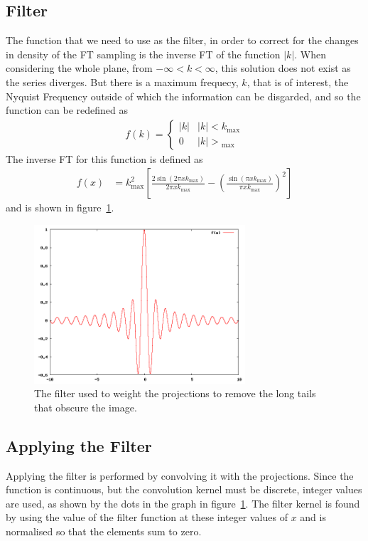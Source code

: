     \subsection{Filter} %
    \label{sub:filter}
        The function that we need to use as the filter, in order to correct for the changes in density of the FT sampling is the inverse FT of the function $|k|$. When considering the whole plane, from $-\infty < k < \infty$, this solution does not exist as the series diverges. But there is a maximum frequecy, $k$, that is of interest, the Nyquist Frequency outside of which the information can be disgarded, and so the function can be redefined as
        \begin{align}
            f(k) =
                \begin{cases}
                    |k| & |k| < k{_\text{max}} \\
                    0   & |k| > {_\text{max}}
                \end{cases}
        \end{align}
        The inverse FT for this function is defined as 
        \begin{align}
            f(x) &= k^2_{\text{max}} \left[ \frac{2\sin(2\pi xk_{\text{max}})}{2\pi xk_{\text{max}}} - \left( \frac{\sin(\pi xk_{\text{max}})}{\pi xk_{\text{max}}} \right)^2 \right]
        \end{align}
        and is shown in figure~\ref{fig:filter_graph}.
        \begin{figure}[ht]
            \centering
                \includegraphics[width=0.7\textwidth]{Files/report_images/inverse_FT_filter.png}
            \caption{The filter used to weight the projections to remove the long tails that obscure the image.\label{fig:filter_graph}}
        \end{figure}
    \subsection{Applying the Filter} %
    \label{sub:applying_the_filter}
        Applying the filter is performed by convolving it with the projections. Since the function is continuous, but the convolution kernel must be discrete, integer values are used, as shown by the dots in the graph in figure~\ref{fig:filter_graph}. The filter kernel is found by using the value of the filter function at these integer values of $x$ and is normalised so that the elements sum to zero.

